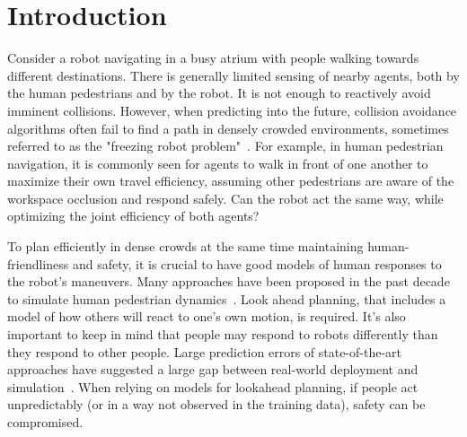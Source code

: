 \documentclass[conference]{IEEEtran}
\begin{document}

\vspace{-0.2em}
\section{Introduction}
\vspace{-0.4em}
\label{sec:intro}
\noindent

Consider a robot navigating in a busy atrium with people walking towards 
different destinations. There is generally limited sensing of nearby agents, 
both by the human pedestrians and by the robot. It is not enough to reactively 
avoid imminent collisions. However, when predicting into the future, 
collision avoidance algorithms often fail to find a path in 
densely crowded environments, sometimes referred to as the "freezing robot 
problem"~\cite{trautman2010unfreezing}. For example, in human pedestrian 
navigation, it is commonly seen for agents to walk in front of one 
another to maximize their own travel efficiency, assuming other pedestrians 
are aware of the workspace occlusion and respond safely. Can the robot act 
the same way, while optimizing the joint efficiency of both agents?  

To plan efficiently in dense crowds at the same time maintaining 
human-friendliness and safety, it is crucial to have good models of human 
responses to the robot's maneuvers. Many approaches have been proposed in the 
past decade to simulate human pedestrian dynamics~\cite{lamarche2004crowd, 
karamouzas2009predictive}.
Look ahead planning, that includes a model of how others will react to one's 
own motion, is required. It's also important to keep in mind that people may 
respond to robots differently than they respond to other people. Large 
prediction errors of state-of-the-art approaches have suggested a large gap 
between real-world deployment and 
simulation~\cite{trautman2015robot,pfeiffer2016predicting}. When 
relying on models for lookahead planning, if people act unpredictably (or in a 
way not observed in the training data), safety can be compromised. 
\end{document}
